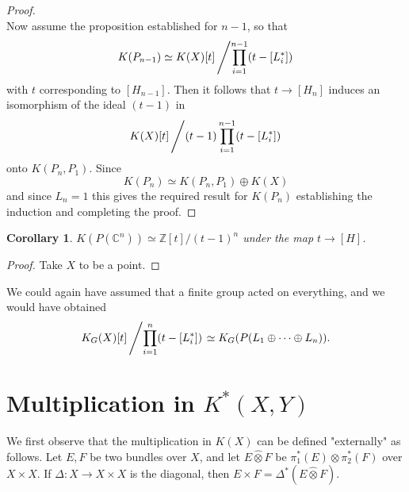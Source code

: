\documentclass[leqno]{book}
\numberwithin{equation}{section}
\newtheorem{corollary}[theorem]{Corollary}
\theoremstyle{definition}
\begin{document}
\begin{proof}
\begin{equation*}
              \end{equation*}
              Now assume the proposition established for $n-1$, so that
              \begin{equation*}
                K(P_{n-1})\simeq K(X)[t]\left/ \prod_{i=1}^{n-1} (t-[L_{i}^{*}])\right.
              \end{equation*}
              with $t$ corresponding to $[H_{n-1}]$. Then it follows that $t\to [H_{n}]$ induces an isomorphism of the ideal $(t-1)$ in
              \begin{equation*}
                K(X)[t]\left/ (t-1)\prod_{i=1}^{n-1} (t-[L_{i}^{*}])\right.
              \end{equation*}
              onto $K(P_{n},P_1)$. Since
              \begin{equation*}
                K(P_{n})\simeq K(P_{n},P_1)\oplus K(X)
              \end{equation*}
              and since $L_{n}=1$ this gives the required result for $K(P_{n})$ establishing the induction and completing the proof.
            \end{proof}

            \begin{corollary}
              $K(P(\mathbb{C}^{n}))\simeq \mathbb{Z}[t]/(t-1)^{n}$ under the map $t\to [H]$.
            \end{corollary}

            \begin{proof}
              Take $X$ to be a point.
            \end{proof}

            We could again have assumed that a finite group acted on everything, and we would have obtained
            \begin{equation*}
              K_{G}(X)[t]\left/\prod_{i=1}^{n} (t-[L_{i}^{*}])\right. \simeq K_{G}(P(L_1\oplus \cdots\oplus L_{n})).
            \end{equation*}

      \newpage
        \section{Multiplication in $K^{*}(X,Y)$}

            We first observe that the multiplication in $K(X)$ can be defined "externally" as follows. Let $E,F$ be two bundles over $X$, and let $E \hat{\otimes }F$ be $\pi_1^{*}(E)\otimes \pi_2^{*}(F)$ over $X\times X$. If $\Delta:X\to X\times X$ is the diagonal, then $E\times F=\Delta^{*}(E \hat{\otimes }F)$.
\end{document}
